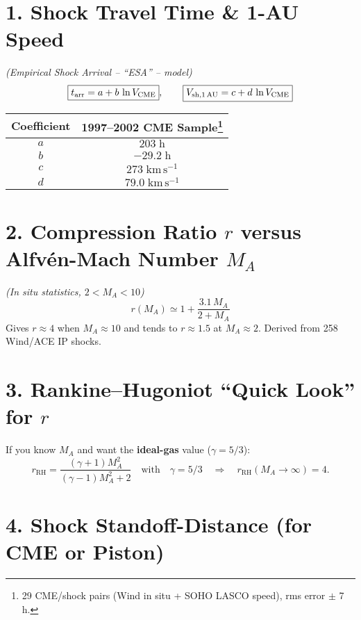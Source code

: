 \hrulefill

\section*{1. Shock Travel Time \& 1-AU Speed}

\textit{(Empirical Shock Arrival -- ``ESA'' -- model)}
\[
\boxed{t_{\rm arr} = a + b\,\ln V_{\rm CME}}, \qquad
\boxed{V_{\rm sh, 1\,\text{AU}} = c + d\,\ln V_{\rm CME}}
\]

\begin{center}
\begin{tabular}{@{}cc@{}}
\toprule
\textbf{Coefficient} & \textbf{1997–2002 CME Sample\footnote{29 CME/shock pairs (Wind in situ + SOHO LASCO speed), rms error $\pm$ 7 h.}} \\
\midrule
$a$ & $203\;\mathrm{h}$ \\
$b$ & $-29.2\;\mathrm{h}$ \\
$c$ & $273\;\mathrm{km\,s^{-1}}$ \\
$d$ & $79.0\;\mathrm{km\,s^{-1}}$ \\
\bottomrule
\end{tabular}
\end{center}

\hrulefill

\section*{2. Compression Ratio $r$ versus Alfvén-Mach Number $M_A$}

\textit{(In situ statistics, $2 < M_A < 10$)}
\[
\boxed{r(M_A) \simeq 1 + \frac{3.1\,M_A}{2 + M_A}}
\]
Gives $r \approx 4$ when $M_A \approx 10$ and tends to $r \approx 1.5$ at $M_A \approx 2$. Derived from 258 Wind/ACE IP shocks.

\hrulefill

\section*{3. Rankine–Hugoniot ``Quick Look'' for $r$}

If you know $M_A$ and want the \textbf{ideal-gas} value ($\gamma = 5/3$):
\[
\boxed{r_{\text{RH}} = \frac{(\gamma + 1)M_A^2}{(\gamma - 1)M_A^2 + 2}} \quad \text{with} \quad \gamma = 5/3 \quad \Rightarrow \quad r_{\text{RH}}(M_A \to \infty) = 4.
\]

\hrulefill

\section*{4. Shock Standoff-Distance (for CME or Piston)}


